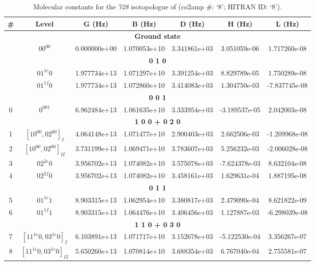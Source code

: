 \begin{table}[h!]
\caption{Molecular constants for the \textit{728} isotopologue of  (co2amp \#: ‘8’; HITRAN ID: ‘8’).}
\label{table:constants_728}
\centering
\begin{tabular}{|c|c|c|c|c|c|c|}
\hline
\textbf{\#} & \textbf{Level} & \textbf{G (Hz)} & \textbf{B (Hz)} & \textbf{D (Hz)} & \textbf{H (Hz)} & \textbf{L (Hz)} \\ \hline
\multicolumn{7}{|c|}{\textbf{Ground state}} \\ \hline
 & $00^00$ & 0.000000e+00 & 1.070053e+10 & 3.341861e+03 & 3.051059e-06 & 1.717260e-08 \\ \hline
\multicolumn{7}{|c|}{\textbf{0 1 0}} \\ \hline
 & $01^{1e}0$ & 1.977734e+13 & 1.071297e+10 & 3.391254e+03 & 8.829789e-05 & 1.750289e-08 \\ \hline
 & $01^{1f}0$ & 1.977734e+13 & 1.072860e+10 & 3.414083e+03 & 1.304750e-03 & -7.837745e-08 \\ \hline
\multicolumn{7}{|c|}{\textbf{0 0 1}} \\ \hline
0 & $0^001$ & 6.962484e+13 & 1.061635e+10 & 3.333954e+03 & -3.189537e-05 & 2.042003e-08 \\ \hline
\multicolumn{7}{|c|}{\textbf{1 0 0 + 0 2 0}} \\ \hline
1 & $[10^00, 02^00]_{I}$ & 4.064148e+13 & 1.071477e+10 & 2.900403e+03 & 2.662506e-03 & -1.209968e-08 \\ \hline
2 & $[10^00, 02^00]_{II}$ & 3.731199e+13 & 1.069471e+10 & 3.783607e+03 & 5.256232e-03 & -2.006028e-08 \\ \hline
3 & $02^{2e}0$ & 3.956702e+13 & 1.074082e+10 & 3.575078e+03 & -7.624378e-03 & 8.632104e-08 \\ \hline
4 & $02^{2f}0$ & 3.956702e+13 & 1.074082e+10 & 3.458161e+03 & 1.629631e-04 & 1.887195e-08 \\ \hline
\multicolumn{7}{|c|}{\textbf{0 1 1}} \\ \hline
5 & $01^{1e}1$ & 8.903315e+13 & 1.062954e+10 & 3.380817e+03 & 2.479090e-04 & 8.621822e-09 \\ \hline
6 & $01^{1f}1$ & 8.903315e+13 & 1.064476e+10 & 3.406456e+03 & 1.127887e-03 & -6.298039e-08 \\ \hline
\multicolumn{7}{|c|}{\textbf{1 1 0 + 0 3 0}} \\ \hline
7 & $[11^{1e}0, 03^{1e}0]_{I}$ & 6.103891e+13 & 1.071717e+10 & 3.152678e+03 & -5.122530e-04 & 3.356267e-07 \\ \hline
8 & $[11^{1e}0, 03^{1e}0]_{II}$ & 5.650260e+13 & 1.070814e+10 & 3.688354e+03 & 6.767040e-04 & 2.755581e-07 \\ \hline

\end{tabular}
\end{table}
